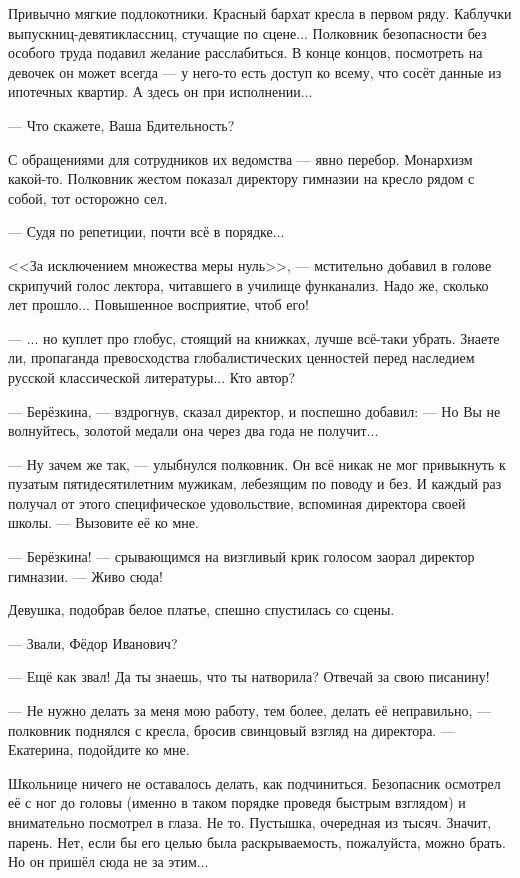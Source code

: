 


Привычно мягкие подлокотники. Красный бархат кресла в первом ряду. Каблучки выпускниц-девятиклассниц, стучащие по сцене...
Полковник безопасности без особого труда подавил желание расслабиться.
В конце концов, посмотреть на девочек он может всегда --- у него-то есть доступ ко всему, что сосёт данные из ипотечных квартир.
А здесь он при исполнении...

--- Что скажете, Ваша Бдительность?

С обращениями для сотрудников их ведомства --- явно перебор. Монархизм какой-то.
Полковник жестом показал директору гимназии на кресло рядом с собой, тот осторожно сел.

--- Судя по репетиции, почти всё в порядке...

<<За исключением множества меры нуль>>, --- мстительно добавил в голове скрипучий голос лектора, читавшего в училище функанализ.
Надо же, сколько лет прошло... Повышенное восприятие, чтоб его!


--- ... но куплет про глобус, стоящий на книжках, лучше всё-таки убрать.
Знаете ли, пропаганда превосходства глобалистических ценностей перед наследием русской классической литературы... Кто автор?


--- Берёзкина, --- вздрогнув, сказал директор, и поспешно добавил:
--- Но Вы не волнуйтесь, золотой медали она через два года не получит...

--- Ну зачем же так, --- улыбнулся полковник.
Он всё никак не мог привыкнуть к пузатым пятидесятилетним мужикам, лебезящим по поводу и без.
И каждый раз получал от этого специфическое удовольствие, вспоминая директора своей школы.
--- Вызовите её ко мне.

--- Берёзкина! --- срывающимся на визгливый крик голосом заорал директор гимназии. --- Живо сюда!

Девушка, подобрав белое платье, спешно спустилась со сцены.

--- Звали, Фёдор Иванович?

--- Ещё как звал! Да ты знаешь, что ты натворила? Отвечай за свою писанину!

--- Не нужно делать за меня мою работу, тем более, делать её неправильно, ---
полковник поднялся с кресла, бросив свинцовый взгляд на директора. --- Екатерина, подойдите ко мне.

Школьнице ничего не оставалось делать, как подчиниться.
Безопасник осмотрел её с ног до головы (именно в таком порядке проведя быстрым взглядом) и внимательно посмотрел в глаза.
Не то. Пустышка, очередная из тысяч. Значит, парень.
Нет, если бы его целью была раскрываемость, пожалуйста, можно брать. Но он пришёл сюда не за этим...

